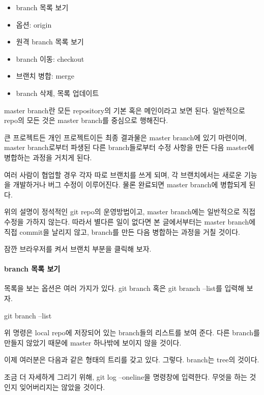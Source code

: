 \documentclass[12pt, a4paper, oneside]{book}
\begin{document}
			\begin{itemize}	[	
							topsep=0.0em,
							itemsep=0.0em,
							leftmargin=6em, 
							labelsep=3em 
							]
				\item 	branch 목록 보기
				\item 	옵션: origin
				\item	원격 branch 목록 보기
				\item	branch 이동: checkout
				\item	브랜치 병합: merge
				\item	branch 삭제, 목록 업데이트
			\end{itemize}


master branch란 모든 repository의 기본 혹은 메인이라고 보면 된다. 
일반적으로 repo의 모든 것은 master branch를 중심으로 행해진다.

큰 프로젝트든 개인 프로젝트이든 최종 결과물은 master branch에 있기 마련이며, 
master branch로부터 파생된 다른 branch들로부터 수정 사항을 만든 다음 
master에 병합하는 과정을 거치게 된다.

여러 사람이 협업할 경우 각자 따로 브랜치를 쓰게 되며, 
각 브랜치에서는 새로운 기능을 개발하거나 버그 수정이 이루어진다. 
물론 완료되면 master branch에 병합되게 된다.

위의 설명이 정석적인 git repo의 운영방법이고, 
master branch에는 일반적으로 직접 수정을 가하지 않는다. 
따라서 별다른 일이 없다면 본 글에서부터는 master branch에 직접 commit을 날리지 않고, 
branch를 만든 다음 병합하는 과정을 거칠 것이다.

잠깐 브라우저를 켜서 브랜치 부분을 클릭해 보자.

\paragraph{branch 목록 보기}

목록을 보는 옵션은 여러 가지가 있다. git branch 혹은 git branch --list를 입력해 보자.

		\begin{tcolorbox}
 		git branch  --list
		\end{tcolorbox}

위 명령은 local repo에 저장되어 있는 branch들의 리스트를 보여 준다. 
다른 branch를 만들지 않았기 때문에 master 하나밖에 보이지 않을 것이다.

이제 여러분은 다음과 같은 형태의 트리를 갖고 있다.
그렇다. branch는 tree의 것이다.

조금 더 자세하게 그리기 위해, git log --oneline을 명령창에 입력한다. 
무엇을 하는 것인지 잊어버리지는 않았을 것이다.
\end{document}
